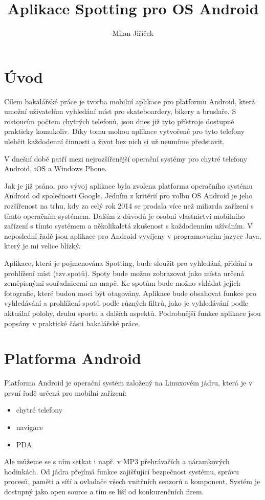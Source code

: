 \documentclass[12pt]{article}
\title{Aplikace Spotting pro OS Android}
\author{Milan Jiříček}
\begin{document}
\maketitle

\newpage

\section{Úvod}
Cílem bakalářské práce je tvorba mobilní aplikace pro platformu Android, která
umožní uživatelům vyhledání míst pro skateboardery, bikery a bruslaře. S rostoucím počtem chytrých telefonů, jsou dnes již tyto přístroje dostupné prakticky komukoliv. Díky tomu mohou aplikace vytvořené pro tyto telefony ulehčit každodenní činnosti a život bez nich si už neumíme představit.

V dnešní době patří mezi nejrozšířenější operační systémy pro chytré telefony Android, iOS a Windows Phone.

Jak je již psáno, pro vývoj aplikace byla zvolena platforma operačního systému
Android od společnosti Google. Jedním z kritérií pro volbu OS Android je jeho
rozšířenost na trhu, kdy za celý rok 2014 se prodala více
než miliarda zařízení s tímto operačním systémem. Dalším z důvodů je osobní
vlastnictví mobilního zařízení s tímto systémem a několikaletá
zkušenost s každodenním užíváním.
V neposlední řadě jsou aplikace pro Android vyvíjeny v programovacím jazyce
Java, který je mi velice blízký.

Aplikace, která je pojmenována Spotting, bude sloužit pro vyhledání, přidání a
prohlížení míst (tzv.spotů). Spoty bude možno zobrazovat jako místa určená
zeměpisnými souřadnicemi na mapě. Ke spotům bude možno vkládat jejich
fotografie, které budou moci být otagovány. Aplikace bude obsahovat funkce
pro vyhledávání a prohlížení spotů  podle různých
filtrů, jako je vyhledávání podle aktuální polohy, druhu sportu a dalších aspektů.
Podrobnější funkce aplikace jsou popsány v praktické části bakalářské
práce.
\newpage

\section{Platforma Android}
Platforma Android je operační systém založený na Linuxovém jádru, která je v první řadě určená pro mobilní zařízení:
\begin{itemize}
\item chytré telefony
\item navigace
\item PDA
\end{itemize}
Ale můžeme se s ním setkat i např. v MP3 přehrávačích a náramkových hodinkách.
Od jádra přejímá funkce zajišťující bezpečnost systému, správu procesů, paměti a síťí a ovladače všech vnitřních senzorů a komponent. Systém je dostupný jako open source a tím se  liší od konkurenčních firem.
\end{document}
